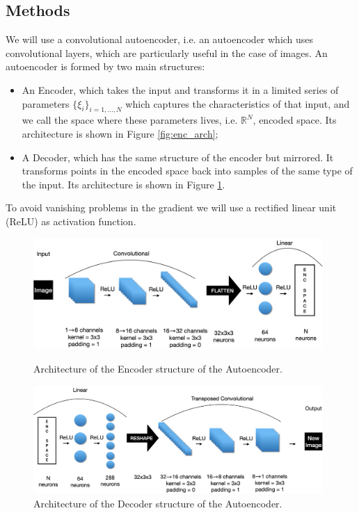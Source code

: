 \subsection{Methods}
We will use a convolutional autoencoder, i.e. an autoencoder which uses convolutional layers, which are particularly useful in the case of images.
An autoencoder is formed by two main structures:
\begin{itemize}
    \item An Encoder, which takes the input and transforms it in a limited series of parameters $\{\xi_i\}_{i=1,\dots, N}$ which captures the characteristics of that input, and we 
        call the space where these parameters lives, i.e. $\mathbb{R}^N$, encoded space. Its architecture is shown in Figure \ref{fig:enc_arch};
    \item A Decoder, which has the same structure of the encoder but mirrored. It transforms points in the encoded space back into samples of the same type of the input.
        Its architecture is shown in Figure \ref{fig:dec_arch}.
\end{itemize}
To avoid vanishing problems in the gradient we will use a rectified linear unit (ReLU) as activation function.
\begin{figure}[h]
    \centering
    \begin{minipage}[t]{0.48\textwidth}
        \centering
        \includegraphics[width=0.98\textwidth]{Images/Encoder.png}
        \caption{Architecture of the Encoder structure of the Autoencoder.}
        \label{fig:enc_arch}
    \end{minipage}\hfill
    \begin{minipage}[t]{0.48\textwidth}
        \centering
        \includegraphics[width=0.98\textwidth]{Images/Decoder.png}
        \caption{Architecture of the Decoder structure of the Autoencoder.}
        \label{fig:dec_arch}
    \end{minipage}
\end{figure}

